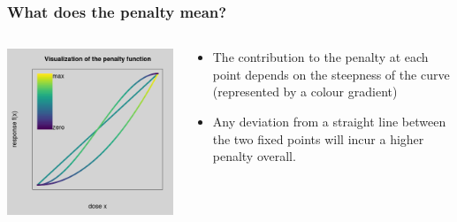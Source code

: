 \documentclass[aspectratio=169]{beamer}
\begin{document}
\begin{frame}
  \frametitle{What does the penalty mean?}

  \begin{columns}
    \begin{column}{5cm}
      \includegraphics[scale=0.4]{figures/penalty1.png}
    \end{column}
    \begin{column}{4cm}
      \begin{itemize}
      \item The contribution to the penalty at each point depends on the
        steepness of the curve (represented by a colour gradient)
      \item  Any deviation from a straight line between the two fixed
        points will incur a higher penalty overall.
      \end{itemize}
    \end{column}
  \end{columns}
  
\end{frame}
\end{document}
